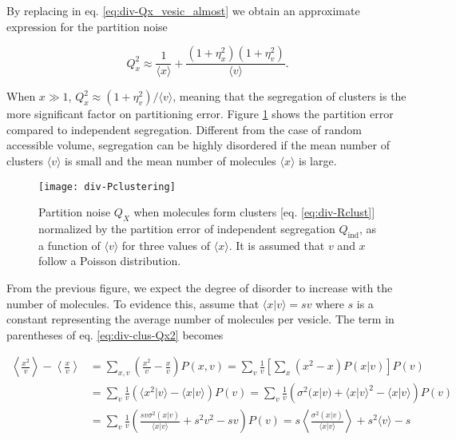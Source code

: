 By replacing in eq. \eqref{eq:div-Qx_vesic_almost} we obtain an approximate expression for the partition noise

\begin{equation}
  \label{eq:div-Rclust}
  Q_x^2 \approx \frac{1}{\langle x\rangle} + \frac{(1+\eta_x^2)(1+\eta_v^2)}{\langle v\rangle}.
\end{equation}

When $x\gg 1$, $Q_x^2\approx(1+\eta_v^2)/\langle v\rangle$, meaning that the segregation of clusters is the more significant factor on partitioning error. Figure \ref{fig:div-Pclustering} shows the partition error compared to independent segregation. Different from the case of random accessible volume, segregation can be highly disordered if the mean number of clusters $\langle v\rangle$ is small and the mean number of molecules $\langle x\rangle$ is large.

\begin{figure}[H]
  \centering
  \texttt{[image: div-Pclustering]}
  \caption[Partition noise when molecules form clusters as a function of the mean number of clusters]{\label{fig:div-Pclustering} Partition noise $Q_X$ when molecules form clusters [eq. \eqref{eq:div-Rclust}] normalized by the partition error of independent segregation $Q_\text{ind}$, as a function of $\langle v\rangle$ for three values of $\langle x\rangle$. It is assumed that $v$ and $x$ follow a Poisson distribution.}
\end{figure}

From the previous figure, we expect the degree of disorder to increase with the number of molecules. To evidence this, assume that $\langle x|v\rangle = sv$ where $s$ is a constant representing the average number of molecules per vesicle. The term in parentheses of eq. \eqref{eq:div-clus-Qx2} becomes

\begin{equation*}
  \begin{split}
    \left\langle \frac{x^2}{v}\right\rangle-\left\langle \frac{x}{v}\right\rangle &= \sum_{x,v}\left( \frac{x^2}{v}- \frac{x}{v}\right)P(x,v) = \sum_v\frac{1}{v}\left[\sum_x\left(x^2- x\right)P(x|v)\right]P(v)\\
    &=\sum_v\frac{1}{v}\left(\langle x^2|v\rangle - \langle x|v\rangle\right)P(v)=\sum_v\frac{1}{v}\left(\sigma^2(x|v) + \langle x|v\rangle^2-\langle x|v\rangle\right)P(v)\\
    &=\sum_v\frac{1}{v}\left(\frac{sv\sigma^2(x|v)}{\langle x|v\rangle} + s^2v^2-sv\right)P(v) = s\left\langle\frac{\sigma^2(x|v)}{\langle x|v\rangle}\right\rangle + s^2\langle v\rangle - s
  \end{split}
\end{equation*}

